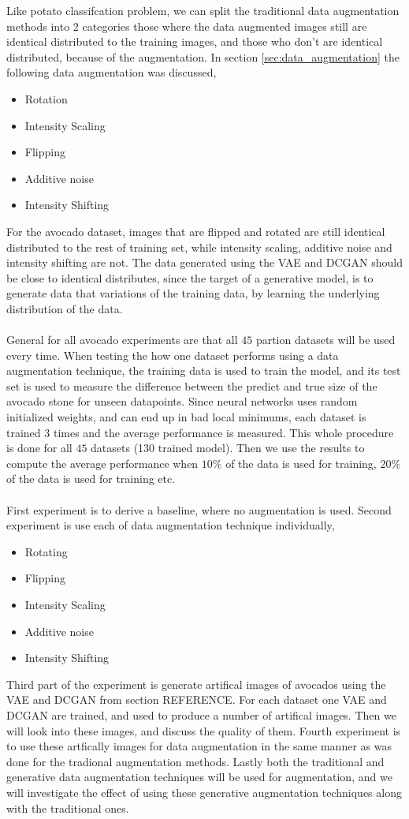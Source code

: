 \documentclass[11pt]{article}
\begin{document}
Like potato classifcation problem, we can split the traditional data augmentation methods into 2 categories those where the data augmented images still are identical distributed to the training images, and those who don't are identical distributed, because of the augmentation. In section \ref{sec:data_augmentation} the following data augmentation was discussed,
\begin{itemize}
    \item Rotation
    \item Intensity Scaling
    \item Flipping
    \item Additive noise
    \item Intensity Shifting
\end{itemize}
For the avocado dataset, images that are flipped and rotated are still identical distributed to the rest of training set, while intensity scaling, additive noise and intensity shifting are not. The data generated using the VAE and DCGAN should be close to identical distributes, since the target of a generative model, is to generate data that variations of the training data, by learning the underlying distribution of the data. 
\\ \\
General for all avocado experiments are that all $45$ partion datasets will be used every time. When testing the how one dataset performs using a data augmentation technique, the training data is used to train the model, and its test set is used to measure the difference between the predict and true size of the avocado stone for unseen datapoints. Since neural networks uses random initialized weights, and can end up in bad local minimums, each dataset is trained 3 times and the average performance is measured. This whole procedure is done for all $45$ datasets (130 trained model). Then we use the results to compute the average performance when $10\%$ of the data is used for training, $20 \%$ of the data is used for training etc.
\\ \\
First experiment is to derive a baseline, where no augmentation is used. Second experiment is use each of data augmentation technique individually,
\begin{itemize}
    \item Rotating
    \item Flipping
    \item Intensity Scaling
    \item Additive noise
    \item Intensity Shifting
\end{itemize}
Third part of the experiment is generate artifical images of avocados using the VAE and DCGAN from section REFERENCE. For each dataset one VAE and DCGAN are trained, and used to produce a number of artifical images. Then we will look into these images, and discuss the quality of them. Fourth experiment is to use these artfically images for data augmentation in the same manner as was done for the tradional augmentation methods. Lastly both the traditional and generative data augmentation techniques will be used for augmentation, and we will investigate the effect of using these generative augmentation techniques along with the traditional ones.
\end{document}
